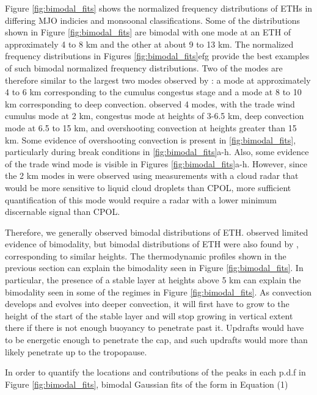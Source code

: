 \documentclass[journal abbreviation, manuscript]{copernicus}
\begin{document}
    Figure \ref{fig:bimodal_fits} shows the normalized frequency distributions of ETHs in differing MJO indicies and monsoonal classifications. Some of the distributions shown in Figure \ref{fig:bimodal_fits} are bimodal with one mode at an ETH of approximately 4 to 8 km and the other at about 9 to 13 km. The normalized frequency distributions in Figures \ref{fig:bimodal_fits}efg provide the best examples of such bimodal normalized frequency distributions. Two of the modes are therefore similar to the largest two modes observed by \cite{Johnsonetal1999}: a mode at approximately 4 to 6 km corresponding to the cumulus congestus stage and a mode at 8 to 10 km corresponding to deep convection. \cite{Kumaretal2013} observed 4 modes, with the trade wind cumulus mode at 2 km, congestus mode at heights of 3-6.5 km, deep convection mode at 6.5 to 15 km, and overshooting convection at heights greater than 15 km. Some evidence of overshooting convection is present in \ref{fig:bimodal_fits}, particularly during break conditions in \ref{fig:bimodal_fits}a-h. Also, some evidence of the trade wind mode is visible in Figures \ref{fig:bimodal_fits}a-h. However, since the 2 km modes in \cite{Johnsonetal1999, Kumaretal2013} were observed using measurements with a cloud radar that would be more sensitive to liquid cloud droplets than CPOL, more sufficient quantification of this mode would require a radar with a lower minimum discernable signal than CPOL. 
    
    Therefore, we generally observed bimodal distributions of ETH. \cite{MayandBallinger2006} observed limited evidence of bimodality, but bimodal distributions of ETH were also found by \cite{Kumaretal2013b}, corresponding to similar heights. The thermodynamic profiles shown in the previous section can explain the bimodality seen in Figure \ref{fig:bimodal_fits}. In particular, the presence of a stable layer at heights above 5 km can explain the bimodality seen in some of the regimes in Figure \ref{fig:bimodal_fits}. As convection develops and evolves into deeper convection, it will first have to grow to the height of the start of the stable layer and will stop growing in vertical extent there if there is not enough buoyancy to penetrate past it. Updrafts would have to be energetic enough to penetrate the cap, and such updrafts would more than likely penetrate up to the tropopause. 

    In order to quantify the locations and contributions of the peaks in each p.d.f in Figure \ref{fig:bimodal_fits}, bimodal Gaussian fits of the form in Equation (1) 
\end{document}
